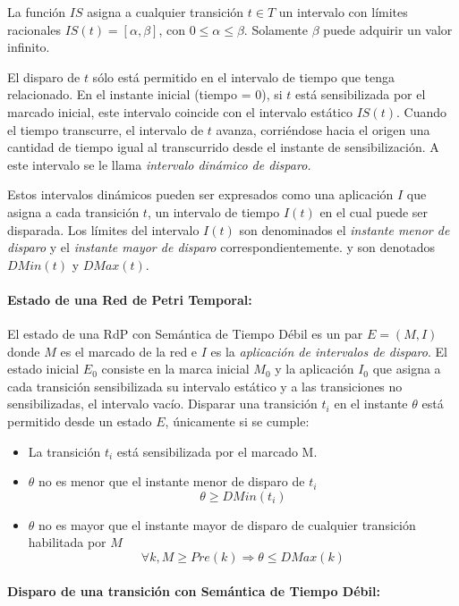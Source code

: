 La función $IS$ asigna a cualquier transición $t \in T$ un intervalo con límites
racionales $IS(t) = [\alpha, \beta]$, con $0 \leq \alpha \leq \beta$. Solamente
$\beta$ puede adquirir un valor infinito.

El disparo de $t$ sólo está permitido en el intervalo de tiempo que tenga
relacionado. En el instante inicial (tiempo = 0), si $t$ está sensibilizada por
el marcado inicial, este intervalo coincide con el intervalo estático $IS(t)$.
Cuando el tiempo transcurre, el intervalo de $t$ avanza, corriéndose hacia el
origen una cantidad de tiempo igual al transcurrido desde el instante de
sensibilización. A este intervalo se le llama \textit{intervalo dinámico de disparo.}

Estos intervalos dinámicos pueden ser expresados como una aplicación $I$ que
asigna a cada transición $t$, un intervalo de tiempo $I(t)$ en el cual puede ser
disparada. Los límites del intervalo $I(t)$ son denominados el \textit{instante
menor de disparo} y el \textit{instante mayor de disparo}
correspondientemente. y son denotados $DMin(t)$ y
$DMax(t)$.\cite{PetriNetsFundamentals}

\paragraph{Estado de una Red de Petri Temporal:}

El estado de una RdP con Semántica de Tiempo Débil es un par $E = (M, I)$ donde
$M$ es el marcado de la red e $I$ es la \textit{aplicación de intervalos de
disparo}. El estado inicial $E_{0}$ consiste en la marca inicial $M_{0}$ y la
aplicación $I_{0}$ que asigna a cada transición sensibilizada su intervalo
estático y a las transiciones no sensibilizadas, el intervalo vacío.
Disparar una transición $t_{i}$ en el instante $\theta$ está permitido desde un
estado $E$, únicamente si se cumple:
\begin{itemize}
  \item La transición $t_{i}$ está sensibilizada por el marcado M.
  \item $\theta$ no es menor que el instante menor de disparo de $t_{i}$
  $$\theta \geq DMin(t_{i})$$
  \item $\theta$ no es mayor que el instante mayor de disparo de cualquier
  transición habilitada por $M$
  $$ \forall k, M \geq Pre(k) \Rightarrow \theta \leq DMax(k) $$
\end{itemize}

\paragraph{Disparo de una transición con Semántica de Tiempo Débil:}

